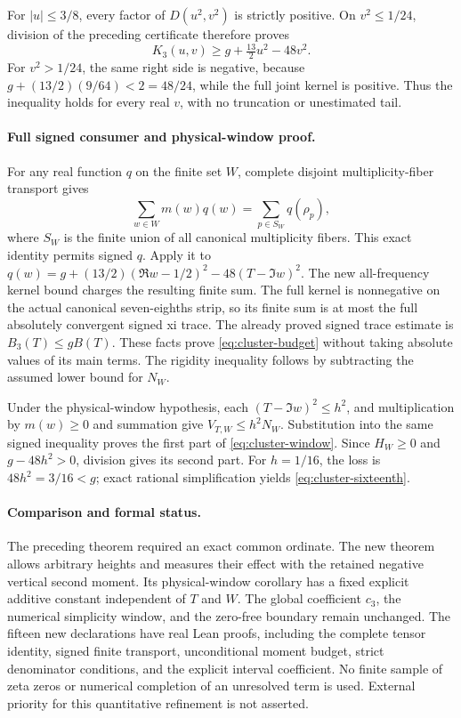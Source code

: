 For \(|u|\le3/8\), every factor of \(D(u^2,v^2)\) is strictly positive.
On \(v^2\le1/24\), division of the preceding certificate therefore proves
\[
 K_3(u,v)\ge g+\tfrac{13}{2}u^2-48v^2.
\]
For \(v^2>1/24\), the same right side is negative, because
\(g+(13/2)(9/64)<2=48/24\), while the full joint kernel is positive.
Thus the inequality holds for every real \(v\), with no truncation or
unestimated tail.

\paragraph{Full signed consumer and physical-window proof.}
For any real function \(q\) on the finite set \(W\), complete disjoint
multiplicity-fiber transport gives
\[
 \sum_{w\in W}m(w)q(w)
 =\sum_{p\in S_W}q(\rho_p),
\]
where \(S_W\) is the finite union of all canonical multiplicity fibers.
This exact identity permits signed \(q\).  Apply it to
\(q(w)=g+(13/2)(\Re w-1/2)^2-48(T-\Im w)^2\).
The new all-frequency kernel bound charges the resulting finite sum.
The full kernel is nonnegative on the actual canonical seven-eighths
strip, so its finite sum is at most the full absolutely convergent
signed xi trace.  The already proved signed trace estimate is
\(B_3(T)\le gB(T)\).  These facts prove
\eqref{eq:cluster-budget} without taking absolute values of its main terms.
The rigidity inequality follows by subtracting the assumed lower bound
for \(N_W\).

Under the physical-window hypothesis, each
\((T-\Im w)^2\le h^2\), and multiplication by \(m(w)\ge0\) and summation
give \(V_{T,W}\le h^2N_W\).  Substitution into the same signed inequality
proves the first part of \eqref{eq:cluster-window}.  Since \(H_W\ge0\)
and \(g-48h^2>0\), division gives its second part.
For \(h=1/16\), the loss is \(48h^2=3/16<g\); exact rational
simplification yields \eqref{eq:cluster-sixteenth}.

\paragraph{Comparison and formal status.}
The preceding theorem required an exact common ordinate.  The new theorem
allows arbitrary heights and measures their effect with the retained
negative vertical second moment.  Its physical-window corollary has a
fixed explicit additive constant independent of \(T\) and \(W\).
The global coefficient \(c_3\), the numerical simplicity window, and the
zero-free boundary remain unchanged.  The fifteen new declarations have
real Lean proofs, including the complete tensor identity, signed finite
transport, unconditional moment budget, strict denominator conditions,
and the explicit interval coefficient.  No finite sample of zeta zeros
or numerical completion of an unresolved term is used.  External priority
for this quantitative refinement is not asserted.

